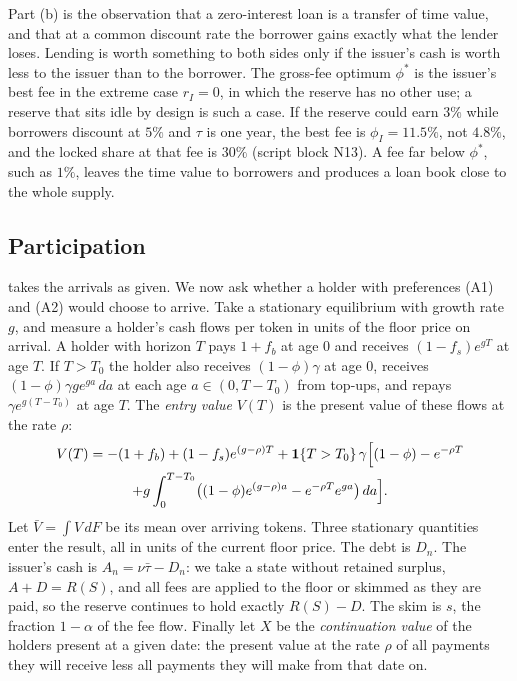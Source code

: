 Part (b) is the observation that a zero-interest loan is a transfer of time value, and that at a common discount rate the borrower gains exactly what the lender loses. Lending is worth something to both sides only if the issuer's cash is worth less to the issuer than to the borrower. The gross-fee optimum $\phi^\ast$ is the issuer's best fee in the extreme case $r_I=0$, in which the reserve has no other use; a reserve that sits idle by design is such a case. If the reserve could earn $3\%$ while borrowers discount at $5\%$ and $\tau$ is one year, the best fee is $\phi_I=11.5\%$, not $4.8\%$, and the locked share at that fee is $30\%$ (script block N13). A fee far below $\phi^\ast$, such as $1\%$, leaves the time value to borrowers and produces a loan book close to the whole supply.

\subsection{Participation}\label{sec:participation}

 takes the arrivals as given. We now ask whether a holder with preferences (A1) and (A2) would choose to arrive. Take a stationary equilibrium with growth rate $g$, and measure a holder's cash flows per token in units of the floor price on arrival. A holder with horizon $T$ pays $1+f_b$ at age $0$ and receives $(1-f_s)e^{gT}$ at age $T$. If $T>T_0$ the holder also receives $(1-\phi)\gamma$ at age $0$, receives $(1-\phi)\gamma g e^{ga}\,da$ at each age $a\in(0,T-T_0)$ from top-ups, and repays $\gamma e^{g(T-T_0)}$ at age $T$. The \emph{entry value} $V(T)$ is the present value of these flows at the rate $\rho$:
\begin{multline}\label{eq:V}
V(T)=-(1+f_b)+(1-f_s)e^{(g-\rho)T}
+\mathbf 1\{T>T_0\}\,\gamma\Bigl[(1-\phi)-e^{-\rho T}\\
+g\int_0^{T-T_0}\bigl((1-\phi)e^{(g-\rho)a}-e^{-\rho T}e^{ga}\bigr)\,da\Bigr].
\end{multline}
Let $\bar V=\int V\,dF$ be its mean over arriving tokens. Three stationary quantities enter the result, all in units of the current floor price. The debt is $D_n$. The issuer's cash is $A_n=\nu\bar\tau-D_n$: we take a state without retained surplus, $A+D=R(S)$, and all fees are applied to the floor or skimmed as they are paid, so the reserve continues to hold exactly $R(S)-D$. The skim is $s$, the fraction $1-\alpha$ of the fee flow. Finally let $X$ be the \emph{continuation value} of the holders present at a given date: the present value at the rate $\rho$ of all payments they will receive less all payments they will make from that date on.

